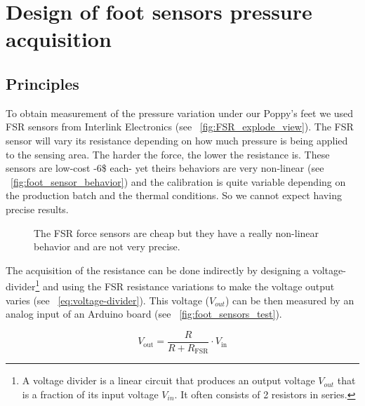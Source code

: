 
\chapter{Design of foot sensors pressure acquisition} %
\label{appendix:design_FSR}


\section{Principles} %
To obtain measurement of the pressure variation under our Poppy's feet we used FSR sensors from Interlink Electronics (see \figurename~\ref{fig:FSR_explode_view}). The FSR sensor will vary its resistance depending on how much pressure is being applied to the sensing area. The harder the force, the lower the resistance is. These sensors are low-cost -6\$ each- yet theirs behaviors are very non-linear (see \figurename~\ref{fig:foot_sensor_behavior}) and the calibration is quite variable depending on the production batch and the thermal conditions. So we cannot expect having precise results.

\begin{figure}[h]
\centering
    \hfil
    \caption{The FSR force sensors are cheap but they have a really non-linear behavior and are not very precise.}
    \label{fig:}
\end{figure}

The acquisition of the resistance can be done indirectly by designing a voltage-divider\footnote{A voltage divider is a linear circuit that produces an output voltage $V_{out}$ that is a fraction of its input voltage $V_{in}$. It often consists of 2 resistors in series.} and using the FSR resistance variations to make the voltage output varies (see \equationname~\ref{eq:voltage-divider}). This voltage ($V_{out}$) can be then measured by an analog input of an Arduino board (see \figurename~\ref{fig:foot_sensors_test}).

\begin{equation}
    V_\mathrm{out} = \frac{R}{R+R_\mathrm{FSR}} \cdot V_\mathrm{in}
\label{eq:voltage-divider}
\end{equation}


